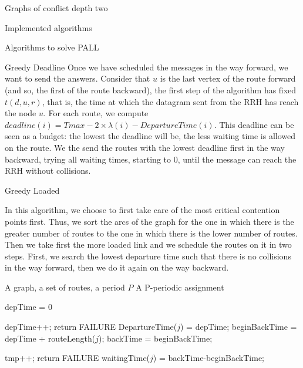 \documentclass[10pt]{article}
\begin{document}
\begin{section}{Graphs of conflict depth two}
\begin{subsection}{Implemented algorithms}
\begin{subsubsection}{Algorithms to solve PALL}
\begin{paragraph}{Greedy Deadline}
      Once we have scheduled the messages in the way forward, we want to send the answers. Consider that $u$ is the last vertex of the route forward (and so, the first of the route backward), the first step of the algorithm has fixed $t(d,u,r)$, that is, the time at which the datagram sent from the RRH has reach the node $u$. For each route, we compute $deadline(i) = Tmax - 2\times\lambda(i) - DepartureTime(i)$. This deadline can be seen as a budget: the lowest the deadline will be, the less waiting time is allowed on the route.\newline
      We the send the routes with the lowest deadline first in the way backward, trying all waiting times, starting to $0$, until the message can reach the RRH without collisions.
            
        \end{paragraph}
    \begin{paragraph}{Greedy Loaded}

In this algorithm, we choose to first take care of the most critical contention points first. Thus, we sort the arcs of the graph for the one in which there is the greater number of routes to the one in which there is the lower number of routes. Then we take first the more loaded link and we schedule the routes on it in two steps.
First, we search the lowest departure time such that there is no collisions in the way forward, then we do it again on the way backward. 

   	\begin{algorithm}[H]
 	\caption{Greedy Loaded}
 	\begin{algorithmic}
 	\REQUIRE A graph, a set of routes, a period $P$
	\ENSURE A P-periodic assignment

	
	\STATE depTime = $0$
	
 	
 	\STATE depTime++;
	\STATE return FAILURE
	\ENDIF
 	\ENDWHILE
	\STATE DepartureTime($j$) = depTime;
	\STATE beginBackTime = depTime + routeLength($j$);
	\STATE backTime = beginBackTime;
	
 	
 	\STATE tmp++;
	\STATE return FAILURE
	\ENDIF
 	\ENDWHILE
	\STATE waitingTime($j$) = backTime-beginBackTime;
	\ENDIF
 	\ENDFOR


\end{algorithmic}
\end{algorithm}
\end{paragraph}
\end{subsubsection}
\end{subsection}
\end{section}
\end{document}
